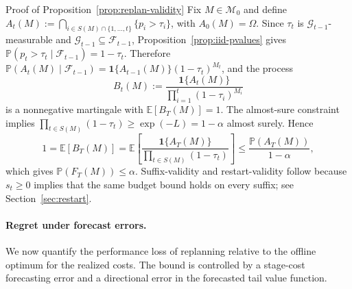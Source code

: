 \documentclass{uai2026} %
\newcommand{\1}{\mathbf{1}}
\newcommand{\ind}[1]{\mathbf{1}\{#1\}}
\newcommand{\prob}{\mathbb{P}}
\newcommand{\expec}{\mathbb{E}}
\newcommand{\F}{\mathcal{F}}
\newcommand{\G}{\mathcal{G}}
\newcommand{\mcal}{\mathcal{M}}
\begin{document}
\begin{appendixproof}{Proof of Proposition~\ref{prop:replan-validity}}
  Fix $M\in\mcal_{0}$ and define $A_t(M):=\bigcap_{i\in S(M)\cap\{1,\dots,t\}}\{p_i>\tau_i\}$, with $A_0(M)=\Omega$.
  Since $\tau_t$ is $\G_{t-1}$-measurable and $\G_{t-1}\subseteq \F_{t-1}$, Proposition~\ref{prop:iid-pvalues} gives $\prob(p_t>\tau_t\mid \F_{t-1}) = 1-\tau_t$.
  Therefore $\prob(A_t(M)\mid \F_{t-1})=\ind{A_{t-1}(M)}(1-\tau_t)^{M_t}$, and the process
  \begin{equation*}
    B_t(M) := \frac{\ind{A_t(M)}}{\prod_{i=1}^{t}(1-\tau_i)^{M_i}}
  \end{equation*}
  is a nonnegative martingale with $\expec[B_T(M)]=1$.
  The almost-sure constraint implies $\prod_{t\in S(M)}(1-\tau_t)\ge \exp(-L)=1-\alpha$ almost surely.
  Hence
  \begin{equation*}
    1=\expec[B_T(M)] = \expec\left[\frac{\ind{A_T(M)}}{\prod_{t\in S(M)}(1-\tau_t)}\right]
    \le \frac{\prob(A_T(M))}{1-\alpha},
  \end{equation*}
  which gives $\prob(F_T(M))\le \alpha$.
  Suffix-validity and restart-validity follow because $s_t\ge 0$ implies that the same budget bound holds on every suffix; see Section~\ref{sec:restart}.
\end{appendixproof}

\paragraph{Regret under forecast errors.}
We now quantify the performance loss of replanning relative to the offline optimum for the realized costs.
The bound is controlled by a stage-cost forecasting error and a directional error in the forecasted tail value function.
\end{document}
